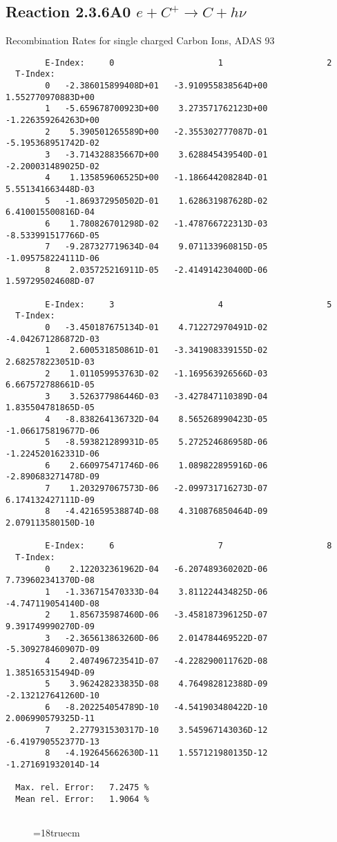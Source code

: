 \subsection{
Reaction 2.3.6A0  $e + C^{+} \rightarrow C + h\nu$
}
 Recombination Rates for single
 charged Carbon Ions, ADAS 93

\begin{verbatim}
        E-Index:     0                     1                     2
  T-Index:
        0   -2.386015899408D+01   -3.910955838564D+00    1.552770970883D+00
        1   -5.659678700923D+00    3.273571762123D+00   -1.226359264263D+00
        2    5.390501265589D+00   -2.355302777087D-01   -5.195368951742D-02
        3   -3.714328835667D+00    3.628845439540D-01   -2.200031489025D-02
        4    1.135859606525D+00   -1.186644208284D-01    5.551341663448D-03
        5   -1.869372950502D-01    1.628631987628D-02    6.410015500816D-04
        6    1.780826701298D-02   -1.478766722313D-03   -8.533991517766D-05
        7   -9.287327719634D-04    9.071133960815D-05   -1.095758224111D-06
        8    2.035725216911D-05   -2.414914230400D-06    1.597295024608D-07

        E-Index:     3                     4                     5
  T-Index:
        0   -3.450187675134D-01    4.712272970491D-02   -4.042671286872D-03
        1    2.600531850861D-01   -3.341908339155D-02    2.682578223051D-03
        2    1.011059953763D-02   -1.169563926566D-03    6.667572788661D-05
        3    3.526377986446D-03   -3.427847110389D-04    1.835504781865D-05
        4   -8.838264136732D-04    8.565268990423D-05   -1.066175819677D-06
        5   -8.593821289931D-05    5.272524686958D-06   -1.224520162331D-06
        6    2.660975471746D-06    1.089822895916D-06   -2.890683271478D-09
        7    1.203297067573D-06   -2.099731716273D-07    6.174132427111D-09
        8   -4.421659538874D-08    4.310876850464D-09    2.079113580150D-10

        E-Index:     6                     7                     8
  T-Index:
        0    2.122032361962D-04   -6.207489360202D-06    7.739602341370D-08
        1   -1.336715470333D-04    3.811224434825D-06   -4.747119054140D-08
        2    1.856735987460D-06   -3.458187396125D-07    9.391749990270D-09
        3   -2.365613863260D-06    2.014784469522D-07   -5.309278460907D-09
        4    2.407496723541D-07   -4.228290011762D-08    1.385165315494D-09
        5    3.962428233835D-08    4.764982812388D-09   -2.132127641260D-10
        6   -8.202254054789D-10   -4.541903480422D-10    2.006990579325D-11
        7    2.277931530317D-10    3.545967143036D-12   -6.419790552377D-13
        8   -4.192645662630D-11    1.557121980135D-12   -1.271691932014D-14

  Max. rel. Error:   7.2475 %
  Mean rel. Error:   1.9064 %


\end{verbatim}
\begin{figure} \label{2.3.6A0}
\epsfxsize=18truecm
\end{figure}
\newpage

